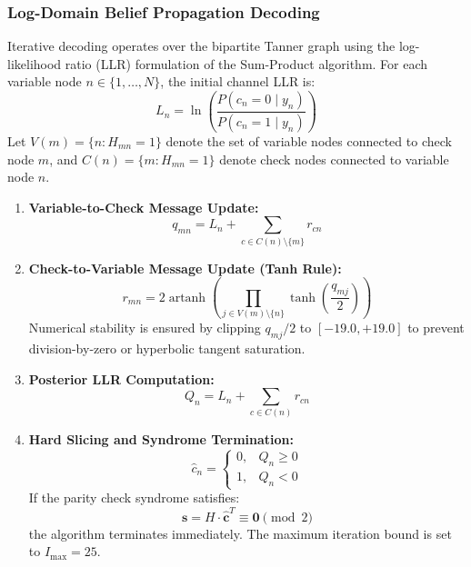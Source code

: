 \documentclass[conference]{IEEEtran}
\begin{document}
\subsubsection{Log-Domain Belief Propagation Decoding}
Iterative decoding operates over the bipartite Tanner graph using the log-likelihood ratio (LLR) formulation of the Sum-Product algorithm. For each variable node $n \in \{1, \dots, N\}$, the initial channel LLR is:
\begin{equation}
L_n = \ln \left( \frac{P(c_n = 0 \mid y_n)}{P(c_n = 1 \mid y_n)} \right)
\end{equation}
Let $V(m) = \{n : H_{mn} = 1\}$ denote the set of variable nodes connected to check node $m$, and $C(n) = \{m : H_{mn} = 1\}$ denote check nodes connected to variable node $n$.
\begin{enumerate}
    \item \textbf{Variable-to-Check Message Update:}
    \begin{equation}
    q_{mn} = L_n + \sum_{c \in C(n) \setminus \{m\}} r_{cn}
    \end{equation}
    \item \textbf{Check-to-Variable Message Update (Tanh Rule):}
    \begin{equation}
    r_{mn} = 2 \operatorname{artanh} \left( \prod_{j \in V(m) \setminus \{n\}} \tanh \left( \frac{q_{mj}}{2} \right) \right)
    \end{equation}
    Numerical stability is ensured by clipping $q_{mj}/2$ to $[-19.0, +19.0]$ to prevent division-by-zero or hyperbolic tangent saturation.
    \item \textbf{Posterior LLR Computation:}
    \begin{equation}
    Q_n = L_n + \sum_{c \in C(n)} r_{cn}
    \end{equation}
    \item \textbf{Hard Slicing and Syndrome Termination:}
    \begin{equation}
    \hat{c}_n = \begin{cases} 0, & Q_n \ge 0 \\ 1, & Q_n < 0 \end{cases}
    \end{equation}
    If the parity check syndrome satisfies:
    \begin{equation}
    \mathbf{s} = H \cdot \hat{\mathbf{c}}^T \equiv \mathbf{0} \pmod 2
    \end{equation}
    the algorithm terminates immediately. The maximum iteration bound is set to $I_{\max} = 25$.
\end{enumerate}
\end{document}
